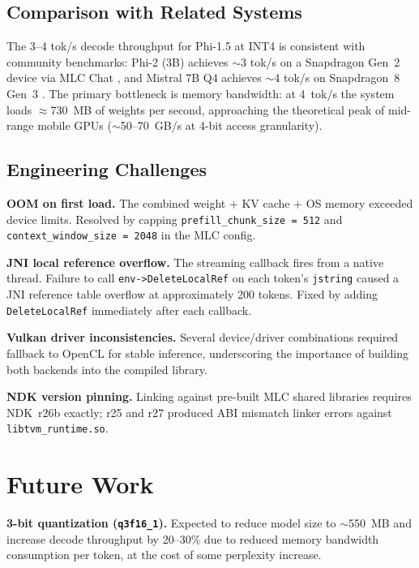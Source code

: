 \documentclass[12pt,letterpaper]{article}
\begin{document}
\subsection{Comparison with Related Systems}

The 3--4 tok/s decode throughput for Phi-1.5 at INT4 is consistent with
community benchmarks: Phi-2 (3B) achieves $\sim$3 tok/s on a Snapdragon Gen~2
device via MLC Chat \cite{reddit_benchmark}, and Mistral 7B Q4 achieves
$\sim$4 tok/s on Snapdragon~8 Gen~3 \cite{reddit_benchmark}.
The primary bottleneck is memory bandwidth: at 4~tok/s the system loads
$\approx$730~MB of weights per second, approaching the theoretical peak
of mid-range mobile GPUs ($\sim$50--70~GB/s at 4-bit access granularity).

\subsection{Engineering Challenges}

\textbf{OOM on first load.}
The combined weight + KV cache + OS memory exceeded device limits.
Resolved by capping \texttt{prefill\_chunk\_size = 512} and
\texttt{context\_window\_size = 2048} in the MLC config.

\textbf{JNI local reference overflow.}
The streaming callback fires from a native thread. Failure to call
\texttt{env->DeleteLocalRef} on each token's \texttt{jstring} caused a
JNI reference table overflow at approximately 200 tokens.
Fixed by adding \texttt{DeleteLocalRef} immediately after each callback.

\textbf{Vulkan driver inconsistencies.}
Several device/driver combinations required fallback to OpenCL for stable
inference, underscoring the importance of building both backends into the
compiled library.

\textbf{NDK version pinning.}
Linking against pre-built MLC shared libraries requires NDK~r26b exactly;
r25 and r27 produced ABI mismatch linker errors against
\texttt{libtvm\_runtime.so}.

\section{Future Work}
\label{sec:future}

\textbf{3-bit quantization (\texttt{q3f16\_1}).}
Expected to reduce model size to $\sim$550~MB and increase decode throughput
by 20--30\% due to reduced memory bandwidth consumption per token,
at the cost of some perplexity increase.
\end{document}
